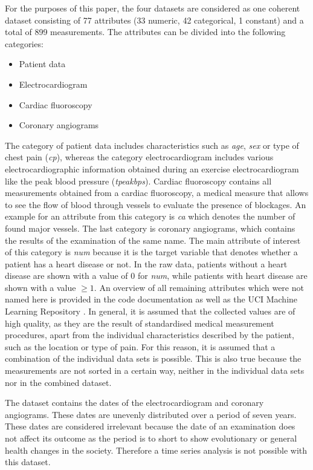 For the purposes of this paper, the four datasets are considered as one coherent dataset consisting of 77 attributes (33 numeric, 42 categorical, 1 constant) and a total of 899 measurements.
The attributes can be divided into the following categories:
\begin{multicols}{2}
    \begin{itemize}
        \item Patient data
        \item Electrocardiogram
        \item Cardiac fluoroscopy
        \item Coronary angiograms
    \end{itemize}
\end{multicols}
The category of patient data includes characteristics such as \textit{age}, \textit{sex} or type of chest pain (\textit{cp}), whereas the category electrocardiogram includes various electrocardiographic information obtained during an exercise electrocardiogram like the peak blood pressure (\textit{tpeakbps}). Cardiac fluoroscopy contains all measurements obtained from a cardiac fluoroscopy, a medical measure that allows to see the flow of blood through vessels to evaluate the presence of blockages. An example for an attribute from this category is \textit{ca} which denotes the number of found major vessels. The last category is coronary angiograms, which contains the results of the examination of the same name. The main attribute of interest of this category is \textit{num} because it is the target variable that denotes whether a patient has a heart disease or not. In the raw data, patients without a heart disease are shown with a value of 0 for \textit{num}, while patients with heart disease are shown with a value  $\geq 1$.
An overview of all remaining attributes which were not named here is provided in the code documentation as well as the UCI Machine Learning Repository \citep{janosi1988}. In general, it is assumed that the collected values are of high quality, as they are the result of standardised medical measurement procedures, apart from the individual characteristics described by the patient, such as the location or type of pain. For this reason, it is assumed that a combination of the individual data sets is possible. This is also true because the measurements are not sorted in a certain way, neither in the individual data sets nor in the combined dataset.

The dataset contains the dates of the electrocardiogram and coronary angiograms. These dates are unevenly distributed over a period of seven years. These dates are considered irrelevant because the date of an examination does not affect its outcome as the period is to short to show evolutionary or general health changes in the society. Therefore a time series analysis is not possible with this dataset.

